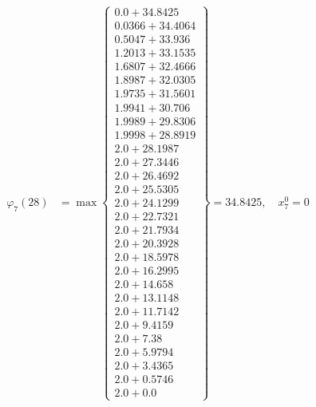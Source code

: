 \documentclass{article}
\begin{document}
\begin{align*}
\varphi_{7}(28) &= \max \left\{ \begin{array}{c}
0.0 + 34.8425 \\
 0.0366 + 34.4064 \\
 0.5047 + 33.936 \\
 1.2013 + 33.1535 \\
 1.6807 + 32.4666 \\
 1.8987 + 32.0305 \\
 1.9735 + 31.5601 \\
 1.9941 + 30.706 \\
 1.9989 + 29.8306 \\
 1.9998 + 28.8919 \\
 2.0 + 28.1987 \\
 2.0 + 27.3446 \\
 2.0 + 26.4692 \\
 2.0 + 25.5305 \\
 2.0 + 24.1299 \\
 2.0 + 22.7321 \\
 2.0 + 21.7934 \\
 2.0 + 20.3928 \\
 2.0 + 18.5978 \\
 2.0 + 16.2995 \\
 2.0 + 14.658 \\
 2.0 + 13.1148 \\
 2.0 + 11.7142 \\
 2.0 + 9.4159 \\
 2.0 + 7.38 \\
 2.0 + 5.9794 \\
 2.0 + 3.4365 \\
 2.0 + 0.5746 \\
 2.0 + 0.0
\end{array} \right\}=34.8425, \quad x_{7}^0=0\\
  

\end{align*}
\end{document}
